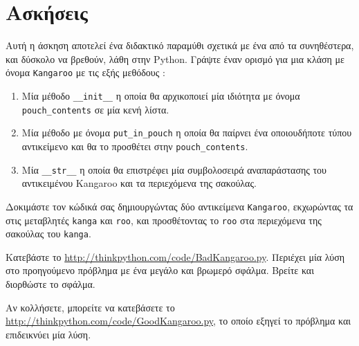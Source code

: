 \documentclass[10pt]{book}
\begin{document}
\section{Ασκήσεις}

\begin{exercise}

Αυτή η άσκηση αποτελεί ένα διδακτικό παραμύθι σχετικά με ένα από τα συνηθέστερα, και 
δύσκολο να βρεθούν, λάθη στην  Python. 
 Γράψτε έναν ορισμό για μια κλάση με όνομα  {\tt Kangaroo}  με τις εξής 
μεθόδους : 

\begin{enumerate}

\item Μία μέθοδο  \verb"__init__"  η οποία θα αρχικοποιεί μία ιδιότητα με 
όνομα  \verb"pouch_contents"  σε μία κενή λίστα.

\item Μία μέθοδο με όνομα  \verb"put_in_pouch"  η οποία θα παίρνει ένα οποιουδήποτε 
τύπου αντικείμενο και θα το προσθέτει στην  \verb"pouch_contents". 

\item Μία  \verb"__str__"  η οποία θα επιστρέφει μία συμβολοσειρά αναπαράστασης του 
αντικειμένου  Kangaroo  και τα περιεχόμενα της σακούλας.

\end{enumerate}
%
 Δοκιμάστε τον κώδικά σας δημιουργώντας δύο αντικείμενα  {\tt Kangaroo},  
εκχωρώντας τα στις μεταβλητές  {\tt kanga}  και  {\tt roo},  και 
προσθέτοντας το  {\tt roo}  στα περιεχόμενα της σακούλας του  {\tt kanga}.

 Κατεβάστε το  \url{http://thinkpython.com/code/BadKangaroo.py}.   Περιέχει 
μία λύση στο προηγούμενο πρόβλημα με ένα μεγάλο και βρωμερό σφάλμα. Βρείτε και διορθώστε 
το σφάλμα.

Αν κολλήσετε, μπορείτε να κατεβάσετε το  \url{http://thinkpython.com/code/GoodKangaroo.py},  το οποίο εξηγεί το πρόβλημα 
και επιδεικνύει	μία λύση.

\end{exercise}
\end{document}
